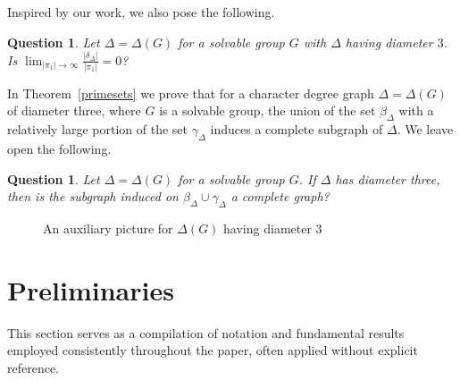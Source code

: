 \documentclass{amsart}
\newtheorem{question}[theorem]{Question}
\begin{document}
Inspired by our work, we also pose the following.
\begin{question}\label{q1b}
  Let $\Delta = \Delta(G)$ for a solvable group $G$ with $\Delta$ having diameter $3$. Is $\lim_{|\pi_1|\to\infty}\frac{|\delta_\Delta|}{|\pi_1|}=0$?
\end{question}

In Theorem~\ref{primesets} we prove that for a character degree graph $\Delta = \Delta(G)$ of diameter three, where $G$ is a solvable group,
the union of the set $\beta_{\Delta}$ with a relatively large portion of the set $\gamma_{\Delta}$ induces a complete subgraph of $\Delta$. We leave open the following.

\begin{question}\label{q2}
  Let $\Delta = \Delta(G)$ for a solvable group $G$. If $\Delta$ has diameter three, then is the subgraph induced on
$\beta_{\Delta} \cup \gamma_{\Delta}$ a complete graph?
\end{question}

\begin{figure}[!ht]
\caption{An auxiliary picture for $\Delta(G)$ having diameter $3$}\label{figure1}
\end{figure}





\section{Preliminaries}\label{preliminaries}
This section serves as a compilation of notation and fundamental results employed consistently throughout the paper, often applied without explicit reference.
\end{document}
